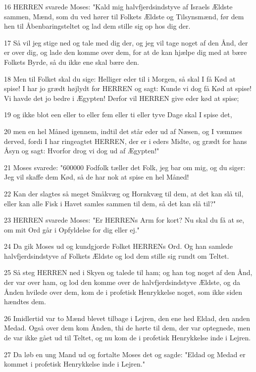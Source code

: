 \par 16 HERREN svarede Moses: "Kald mig halvfjerdsindstyve af Israels Ældste sammen, Mænd, som du ved hører til Folkets Ældste og Tilsynsmænd, før dem hen til Åbenbaringsteltet og lad dem stille sig op hos dig der.
\par 17 Så vil jeg stige ned og tale med dig der, og jeg vil tage noget af den Ånd, der er over dig, og lade den komme over dem, for at de kan hjælpe dig med at bære Folkets Byrde, så du ikke ene skal bære den.
\par 18 Men til Folket skal du sige: Helliger eder til i Morgen, så skal I få Kød at spise! I har jo grædt højlydt for HERREN og sagt: Kunde vi dog få Kød at spise! Vi havde det jo bedre i Ægypten! Derfor vil HERREN give eder kød at spise;
\par 19 og ikke blot een eller to eller fem eller ti eller tyve Dage skal I spise det,
\par 20 men en hel Måned igennem, indtil det står eder ud af Næsen, og I væmmes derved, fordi I har ringeagtet HERREN, der er i eders Midte, og grædt for hans Åsyn og sagt: Hvorfor drog vi dog ud af Ægypten!"
\par 21 Moses svarede: "600000 Fodfolk tæller det Folk, jeg bar om mig, og du siger: Jeg vil skaffe dem Kød, så de har nok at spise en hel Måned!
\par 22 Kan der slagtes så meget Småkvæg og Hornkvæg til dem, at det kan slå til, eller kan alle Fisk i Havet samles sammen til dem, så det kan slå til?"
\par 23 HERREN svarede Moses: "Er HERRENs Arm for kort? Nu skal du få at se, om mit Ord går i Opfyldelse for dig eller ej."
\par 24 Da gik Moses ud og kundgjorde Folket HERRENs Ord. Og han samlede halvfjerdsindstyve af Folkets Ældste og lod dem stille sig rundt om Teltet.
\par 25 Så steg HERREN ned i Skyen og talede til ham; og han tog noget af den Ånd, der var over ham, og lod den komme over de halvfjerdsindstyve Ældste, og da Ånden hvilede over dem, kom de i profetisk Henrykkelse noget, som ikke siden hændtes dem.
\par 26 Imidlertid var to Mænd blevet tilbage i Lejren, den ene hed Eldad, den anden Medad. Også over dem kom Ånden, thi de hørte til dem, der var optegnede, men de var ikke gået ud til Teltet, og nu kom de i profetisk Henrykkelse inde i Lejren.
\par 27 Da løb en ung Mand ud og fortalte Moses det og sagde: "Eldad og Medad er kommet i profetisk Henrykkelse inde i Lejren."
